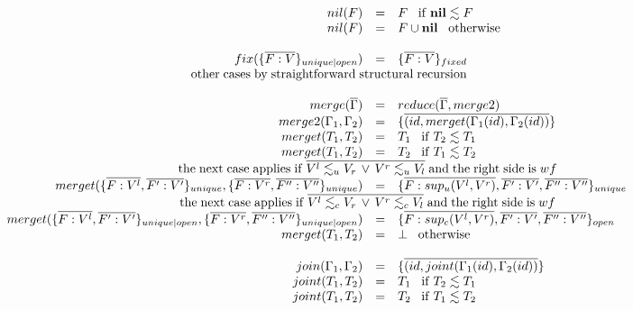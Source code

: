 \documentclass[preprint]{sigplanconf}
\newcommand{\Nil}{\mathbf{nil}}
\newcommand{\env}{\Gamma}
\begin{document}
\begin{figure*}
{\[\begin{array}{rcl}
    nil(F) & = & F \;\;\; \mathrm{if}\;\Nil \lesssim F\\
    nil(F) & = & F \cup \Nil \;\;\; \mathrm{otherwise}\\\\
	fix(\{\overline{F:V}\}_{unique|open}) & = &
	\{\overline{F:V}\}_{fixed}\\
	\multicolumn{3}{c}{\;\;\;\;\;\;\;\mathrm{other\;cases\;by\;straightforward\;structural\;recursion}}\\\\
	merge(\overline{\env}) & = & reduce(\overline{\env}, merge2)\\
	merge2(\env_1,\env_2) & = & \{\overline{(id,merget(\env_1(id),\env_2(id))}\}\\
	merget(T_1, T_2) & = & T_1 \;\;\; \mathrm{if\;} T_2 \lesssim T_1\\
	merget(T_1, T_2) & = & T_2 \;\;\; \mathrm{if\;} T_1 \lesssim T_2\\
	\multicolumn{3}{c}{\;\;\;\;\;\;\;\;\;\;\;\;\;\;\;\;\;\;\;\;\;\;\;\;\;\;\;\;\;\mathrm{the\;next\;case\;applies\;if}\;
		\overline{V^l \lesssim_u V_r \,\vee\, V^r \lesssim_u V_l}\;\mathrm{and\;the\;right\; side\; is\;}wf}\\
	merget(\{\overline{F:V^l},\overline{F^{\prime}:V^\prime}\}_{unique},
	\{\overline{F:V^r},\overline{F^{\prime\prime}:V^{\prime\prime}}\}_{unique}) &=&
	\{\overline{F:sup_u(V^l,V^r)},\overline{F^\prime:V^\prime},\overline{F^{\prime\prime}:V^{\prime\prime}}\}_{unique}
	\\
	\multicolumn{3}{c}{\;\;\;\;\;\;\;\;\;\;\;\;\;\;\;\;\;\;\;\;\;\;\;\;\;\;\;\;\;\mathrm{the\;next\;case\;applies\;if}\;
		\overline{V^l \lesssim_c V_r \,\vee\, V^r \lesssim_c V_l}\;\mathrm{and\;the\;right\; side\; is\;}wf}\\
	merget(\{\overline{F:V^l},\overline{F^{\prime}:V^{\prime}}\}_{unique|open},
	\{\overline{F:V^r},\overline{F^{\prime\prime}:V^{\prime\prime}}\}_{unique|open}) &=&
	\{\overline{F:sup_c(V^l,V^r)},\overline{F^\prime:V^\prime},\overline{F^{\prime\prime}:V^{\prime\prime}}\}_{open}
	\\
	merget(T_1, T_2) & = & \bot \;\;\; \mathrm{otherwise}\\\\
	join(\env_1,\env_2) & = & \{\overline{(id,joint(\env_1(id),\env_2(id))}\}\\
	joint(T_1, T_2) & = & T_1 \;\;\; \mathrm{if\;} T_2 \lesssim T_1\\
	joint(T_1, T_2) & = & T_2 \;\;\; \mathrm{if\;} T_1 \lesssim T_2\\

\end{array}\]}
\end{figure*}
\end{document}
